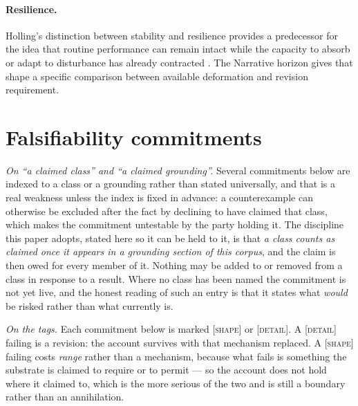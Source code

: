 \documentclass[11pt,a4paper]{article}
\theoremstyle{remark}
\begin{document}
\paragraph{Resilience.}
Holling's distinction between stability and resilience provides a predecessor for the idea that routine performance can remain intact while the capacity to absorb or adapt to disturbance has already contracted \citep{holling1973resilience}. The Narrative horizon gives that shape a specific comparison between available deformation and revision requirement.

\section{Falsifiability commitments}\label{sec:falsifiability}

\noindent\emph{On ``a claimed class'' and ``a claimed grounding''.} Several commitments below are
indexed to a class or a grounding rather than stated universally, and that is a real weakness unless
the index is fixed in advance: a counterexample can otherwise be excluded after the fact by declining
to have claimed that class, which makes the commitment untestable by the party holding it. The
discipline this paper adopts, stated here so it can be held to it, is that \emph{a class counts as
claimed once it appears in a grounding section of this corpus}, and the claim is then owed for every
member of it. Nothing may be added to or removed from a class in response to a result. Where no class
has been named the commitment is not yet live, and the honest reading of such an entry is that it
states what \emph{would} be risked rather than what currently is.

\noindent\emph{On the tags.} Each commitment below is marked \textsc{[shape]} or \textsc{[detail]}.
A \textsc{[detail]} failing is a revision: the account survives with that mechanism replaced. A
\textsc{[shape]} failing costs \emph{range} rather than a mechanism, because what fails is something
the substrate is claimed to require or to permit --- so the account does not hold where it claimed to,
which is the more serious of the two and is still a boundary rather than an annihilation.
\end{document}
